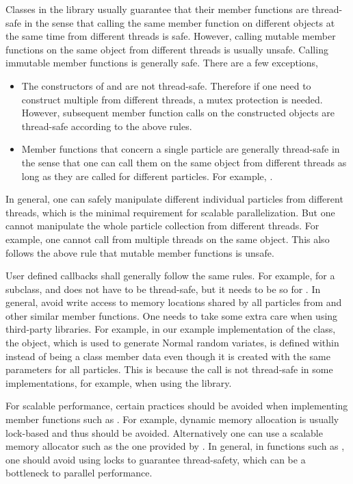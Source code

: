 \documentclass[11pt, fontset=Minion, showoverfull,
bib, mintcode, minted=cache]{marticle}
\begin{document}
Classes in the \vsmc library usually guarantee that their member functions are
thread-safe in the sense that calling the same member function on different
objects at the same time from different threads is safe. However, calling
mutable member functions on the same object from different threads is usually
unsafe. Calling immutable member functions is generally safe. There are a few
exceptions,
\begin{itemize}
  \item The constructors of  and  are
    not thread-safe. Therefore if one need to construct multiple
     from different threads, a mutex protection is needed.
    However, subsequent member function calls on the constructed objects are
    thread-safe according to the above rules.
  \item Member functions that concern a single particle are generally
    thread-safe in the sense that one can call them on the same object from
    different threads as long as they are called for different particles. For
    example, .
\end{itemize}
In general, one can safely manipulate different individual particles from
different threads, which is the minimal requirement for scalable
parallelization. But one cannot manipulate the whole particle collection from
different threads. For example, one cannot call
 from multiple threads on the same
object. This also follows the above rule that mutable member functions is
unsafe.

User defined callbacks shall generally follow the same rules. For example, for
a  subclass,  and
 does not have to be thread-safe, but it needs to be
so for . In general, avoid write access to memory
locations shared by all particles from  and other
similar member functions. One needs to take some extra care when using
third-party libraries. For example, in our example implementation of the
 class, the  object, which is used to
generate Normal random variates, is defined within 
instead of being a class member data even though it is created with the same
parameters for all particles. This is because the call
 is not thread-safe in some implementations, for
example, when using the \lboost library.

For scalable performance, certain practices should be avoided when
implementing member functions such as . For example,
dynamic memory allocation is usually lock-based and thus should be avoided.
Alternatively one can use a scalable memory allocator such as the one provided
by \ltbb. In general, in functions such as , one should
avoid using locks to guarantee thread-safety, which can be a bottleneck to
parallel performance.
\end{document}
